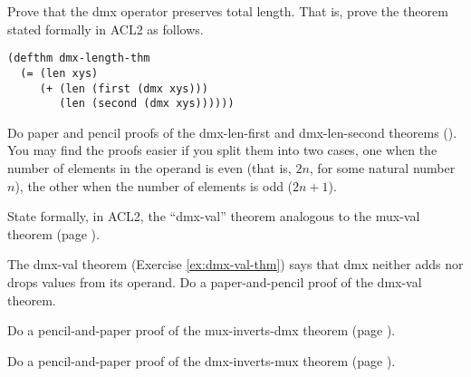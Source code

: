 \begin{ExerciseList}
\Exercise
Prove that the dmx operator preserves total length.
That is, prove the theorem
stated formally in ACL2 as follows.

\label{thm:dmx-length}
\begin{Verbatim}
(defthm dmx-length-thm
  (= (len xys)
     (+ (len (first (dmx xys)))
        (len (second (dmx xys))))))
\end{Verbatim}

\Exercise
Do paper and pencil proofs of the dmx-len-first and dmx-len-second
theorems (\pageref{thm:dmx-length-first-second}).
You may find the proofs easier if you split them into
two cases, one when the number of elements in the operand is even
(that is, $2n$, for some natural number $n$),
the other when the number of elements is odd ($2n+1$).

\Exercise [label={ex:dmx-val-thm}]
State formally, in ACL2, the ``dmx-val'' theorem
analogous to the mux-val theorem (page \pageref{defthm:mux-val}).

\Exercise
The dmx-val theorem (Exercise \ref{ex:dmx-val-thm})
says that dmx neither adds nor drops values from its operand.
Do a paper-and-pencil proof of the dmx-val theorem.

\Exercise
Do a pencil-and-paper proof of the mux-inverts-dmx theorem
(page \pageref{thm:mux-inverts-dmx}).

\Exercise
Do a pencil-and-paper proof of the dmx-inverts-mux theorem
(page \pageref{thm:dmx-inverts-mux}).
\end{ExerciseList}
